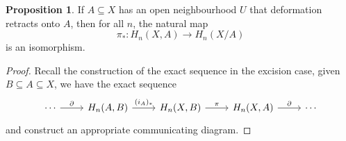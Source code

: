 \documentclass[]{article}
\theoremstyle{definition}
\theoremstyle{definition}
\newtheorem{proposition}{Proposition}[section]
\begin{document}
\begin{proposition}
  If \(A \subseteq X\) has an open neighbourhood \(U\) that deformation retracts 
  onto \(A\), then for all \(n\), the natural map 
  \[\pi_* : H_n(X, A) \to H_n(X / A)\]
  is an isomorphism.
\end{proposition}
\begin{proof}
  Recall the construction of the exact sequence in the excision case, given 
  \(B \subseteq A \subseteq X\), we have the exact sequence 
  \[\begin{tikzcd}
    \cdots & {H_n(A, B)} & {H_n(X, B)} & {H_n(X, A)} & \cdots
    \arrow["{(i_A)_*}", from=1-2, to=1-3]
    \arrow["\partial", from=1-4, to=1-5]
    \arrow["\partial", from=1-1, to=1-2]
    \arrow["\pi", from=1-3, to=1-4]
  \end{tikzcd}\]
  and construct an appropriate communicating diagram.
\end{proof}
\end{document}
